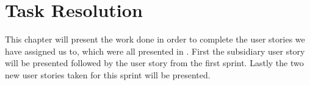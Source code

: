 \chapter{Task Resolution}
This chapter will present the work done in order to complete the user stories we have assigned us to, which were all presented in .
First the subsidiary user story will be presented followed by the user story from the first sprint.
Lastly the two new user stories taken for this sprint will be presented.




